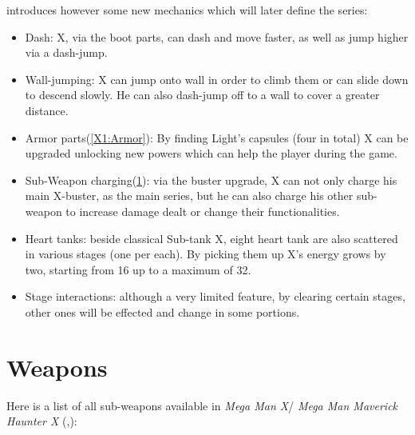 \x introduces however some new mechanics which will later define the series\cite{wiki:X1_features}:
\begin{itemize}
	\item Dash: X, via the boot parts, can dash and move faster, as well as jump higher via a dash-jump.
	\item Wall-jumping: X can jump onto wall in order to climb them or can slide down to descend slowly. He can also dash-jump off to a wall to cover a greater distance.
	\item Armor parts(\ref{X1:Armor}): By finding Light's capsules (four in total) X can be upgraded unlocking new powers which can help the player during the game.
	\item Sub-Weapon charging(\ref{X1:sub_weapon}): via the buster upgrade, X can not only charge his main X-buster, as the main series, but he can also charge his other sub-weapon to increase damage dealt or change their functionalities.
	\item Heart tanks: beside classical Sub-tank X, eight heart tank are also scattered in various stages (one per each). By picking them up X's energy grows by two, starting from 16 up to a maximum of 32\cite{stratwiki:Heart_tank}.
	\item Stage interactions: although a very limited feature, by clearing certain stages, other ones will be effected and change in some portions.
\end{itemize}

\section{Weapons}\label{X1:sub_weapon}
Here is a list of all sub-weapons available in\textit{ Mega Man X}/ \textit{Mega Man Maverick Haunter X} (\cite{MHX:manual},\cite{wiki:X_weapons}):

